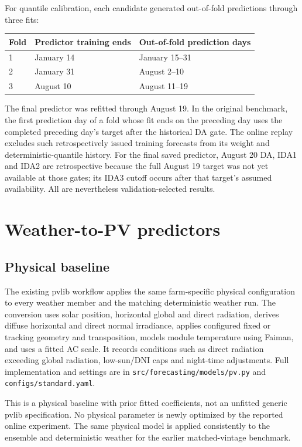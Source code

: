 \documentclass[11pt,a4paper]{article}
\newcommand{\code}[1]{\nolinkurl{#1}}
\begin{document}
For quantile calibration, each candidate generated out-of-fold predictions through three fits:
\begin{center}\small\begin{tabular}{lll}\toprule
Fold & Predictor training ends & Out-of-fold prediction days\\\midrule
1 & January 14 & January 15--31\\
2 & January 31 & August 2--10\\
3 & August 10 & August 11--19\\\bottomrule\end{tabular}\end{center}
The final predictor was refitted through August 19. In the original benchmark, the first prediction day of a fold whose fit ends on the preceding day uses the completed preceding day's target after the historical DA gate. The online replay excludes such retrospectively issued training forecasts from its weight and deterministic-quantile history. For the final saved predictor, August 20 DA, IDA1 and IDA2 are retrospective because the full August 19 target was not yet available at those gates; its IDA3 cutoff occurs after that target's assumed availability. All are nevertheless validation-selected results.

\section{Weather-to-PV predictors}
\subsection{Physical baseline}
The existing pvlib workflow applies the same farm-specific physical configuration to every weather member and the matching deterministic weather run. The conversion uses solar position, horizontal global and direct radiation, derives diffuse horizontal and direct normal irradiance, applies configured fixed or tracking geometry and transposition, models module temperature using Faiman, and uses a fitted AC scale. It records conditions such as direct radiation exceeding global radiation, low-sun/DNI caps and night-time adjustments. Full implementation and settings are in \code{src/forecasting/models/pv.py} and \code{configs/standard.yaml}.

This is a physical baseline with prior fitted coefficients, not an unfitted generic pvlib specification. No physical parameter is newly optimized by the reported online experiment. The same physical model is applied consistently to the ensemble and deterministic weather for the earlier matched-vintage benchmark.
\end{document}
